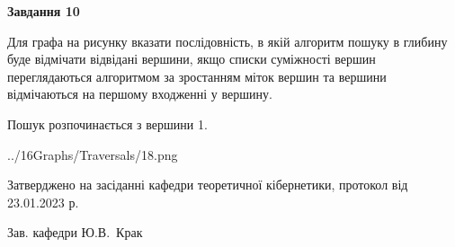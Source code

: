 \documentclass[12pt, ukrainian]{article}
\begin{document}
{\begin {large}
{\begin {center}\textbf{Завдання 10}\end {center}}\par
Для графа на рисунку вказати послідовність, в якій алгоритм пошуку в глибину буде відмічати відвідані вершини, якщо списки суміжності вершин переглядаються алгоритмом за зростанням міток вершин та вершини відмічаються на першому вход\-женні у вершину.\par
Пошук розпочинається з вершини 1.\par

\begin{center}
	{../16Graphs/Traversals/18.png}
\end{center}\par
\newpage


\end {large}
}
{\smallskip \begin {small} Затверджено на засіданні кафедри теоретичної кібернетики, протокол  від   23.01.2023 р.\par\smallskip\smallskip
{\parbox {6.5 cm}{Зав. кафедри \dotfill Ю.В.~Крак}} \end{small}}
\end{document}
